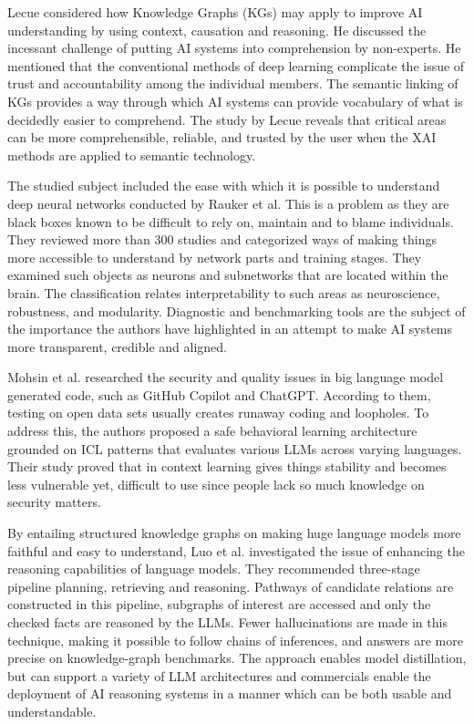 \vspace{1em} 


Lecue considered how Knowledge Graphs (KGs) may apply to improve AI understanding by using context, causation and reasoning\cite{Lecue2020}. He discussed the incessant challenge of putting AI systems into comprehension by non-experts. He mentioned that the conventional methods of deep learning complicate the issue of trust and accountability among the individual members. The semantic linking of KGs provides a way through which AI systems can provide vocabulary of what is decidedly easier to comprehend. The study by Lecue reveals that critical areas can be more comprehensible, reliable, and trusted by the user when the XAI methods are applied to semantic technology.


\vspace{1em} 
The studied subject included the ease with which it is possible to understand deep neural networks conducted by Rauker et al\cite{Rauker2023}. This is a problem as they are black boxes known to be difficult to rely on, maintain and to blame individuals. They reviewed more than 300 studies and categorized ways of making things more accessible to understand by network parts and training stages. They examined such objects as neurons and subnetworks that are located within the brain. The classification relates interpretability to such areas as neuroscience, robustness, and modularity. Diagnostic and benchmarking tools are the subject of the importance the authors have highlighted in an attempt to make AI systems more transparent, credible and aligned.


\vspace{1em} 

Mohsin et al. researched the security and quality issues in big language model generated code, such as GitHub Copilot and ChatGPT\cite{Mohsin2024}. According to them, testing on open data sets usually creates runaway coding and loopholes. To address this, the authors proposed a safe behavioral learning architecture grounded on ICL patterns that evaluates various LLMs across varying languages. Their study proved that in context learning gives things stability and becomes less vulnerable yet, difficult to use since people lack so much knowledge on security matters.

\vspace{1em} 
By entailing structured knowledge graphs on making huge language models more faithful and easy to understand, Luo et al\cite{Luo2024RoG}. investigated the issue of enhancing the reasoning capabilities of language models. They recommended three-stage pipeline planning, retrieving and reasoning. Pathways of candidate relations are constructed in this pipeline, subgraphs of interest are accessed and only the checked facts are reasoned by the LLMs. Fewer hallucinations are made in this technique, making it possible to follow chains of inferences, and answers are more precise on knowledge-graph benchmarks. The approach enables model distillation, but can support a variety of LLM architectures and commercials enable the deployment of AI reasoning systems in a manner which can be both usable and understandable.

